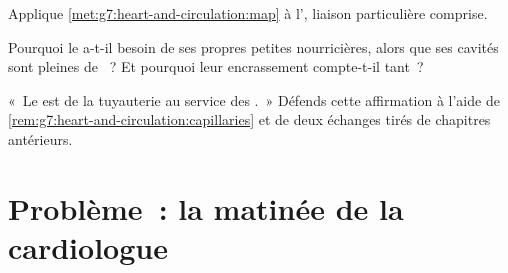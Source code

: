 \begin{exercise}[$\star\star$]\label{exo:g7:heart-and-circulation:10}
Applique \cref{met:g7:heart-and-circulation:map} à l',
liaison particulière comprise.
\end{exercise}

\begin{exercise}[$\star\star$]\label{exo:g7:heart-and-circulation:11}
Pourquoi le  a-t-il besoin de ses propres petites 
nourricières, alors que ses cavités sont pleines de ~? Et
pourquoi leur encrassement compte-t-il tant~?
\end{exercise}

\begin{exercise}[$\star\star\star$]\label{exo:g7:heart-and-circulation:12}
«~Le  est de la tuyauterie au service des .~» Défends
cette affirmation à l'aide de
\cref{rem:g7:heart-and-circulation:capillaries} et de deux échanges
tirés de chapitres antérieurs.
\end{exercise}

\section{Problème~: la matinée de la cardiologue}

